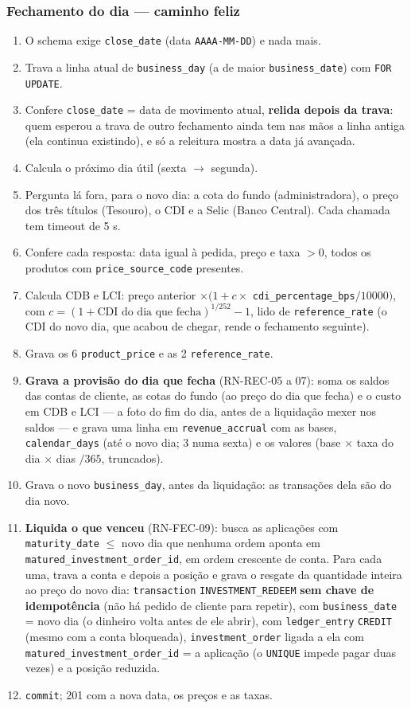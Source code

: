 \documentclass[11pt,a4paper]{article}
\newcommand{\tb}[1]{\texttt{#1}}
\begin{document}
\subsubsection*{Fechamento do dia --- caminho feliz}
\begin{enumerate}
  \item O schema exige \tb{close_date} (data \tb{AAAA-MM-DD}) e nada mais.
  \item Trava a linha atual de \tb{business_day} (a de maior \tb{business_date}) com
        \tb{FOR UPDATE}.
  \item Confere \tb{close_date} = data de movimento atual, \textbf{relida depois da trava}: quem
        esperou a trava de outro fechamento ainda tem nas mãos a linha antiga (ela continua
        existindo), e só a releitura mostra a data já avançada.
  \item Calcula o próximo dia útil (sexta $\to$ segunda).
  \item Pergunta lá fora, para o novo dia: a cota do fundo (administradora), o preço dos três
        títulos (Tesouro), o CDI e a Selic (Banco Central). Cada chamada tem timeout de 5 s.
  \item Confere cada resposta: data igual à pedida, preço e taxa $> 0$, todos os produtos com
        \tb{price_source_code} presentes.
  \item Calcula CDB e LCI: preço anterior $\times (1 + c \times$ \tb{cdi_percentage_bps}$/10000)$,
        com $c = (1 + \text{CDI do dia que fecha})^{1/252} - 1$, lido de \tb{reference_rate}
        (o CDI do novo dia, que acabou de chegar, rende o fechamento seguinte).
  \item Grava os 6 \tb{product_price} e as 2 \tb{reference_rate}.
  \item \textbf{Grava a provisão do dia que fecha} (RN-REC-05 a 07): soma os saldos das contas de
        cliente, as cotas do fundo (ao preço do dia que fecha) e o custo em CDB e LCI --- a foto do
        fim do dia, antes de a liquidação mexer nos saldos --- e grava uma linha em
        \tb{revenue_accrual} com as bases, \tb{calendar_days} (até o novo dia; 3 numa sexta) e os
        valores (base $\times$ taxa do dia $\times$ dias $/ 365$, truncados).
  \item Grava o novo \tb{business_day}, antes da liquidação: as transações dela são do dia novo.
  \item \textbf{Liquida o que venceu} (RN-FEC-09): busca as aplicações com \tb{maturity_date}
        $\leq$ novo dia que nenhuma ordem aponta em \tb{matured_investment_order_id}, em ordem crescente de
        conta. Para cada uma, trava a conta e depois a posição e grava o resgate da quantidade
        inteira ao preço do novo dia: \tb{transaction} \tb{INVESTMENT_REDEEM} \textbf{sem chave
        de idempotência} (não há pedido de cliente para repetir), com \tb{business_date} = novo
        dia (o dinheiro volta antes de ele abrir), com \tb{ledger_entry}
        \tb{CREDIT} (mesmo com a conta bloqueada), \tb{investment_order} ligada a ela com
        \tb{matured_investment_order_id} = a aplicação (o \tb{UNIQUE} impede pagar duas vezes) e a posição
        reduzida.
  \item \tb{commit}; 201 com a nova data, os preços e as taxas.
\end{enumerate}
\end{document}
